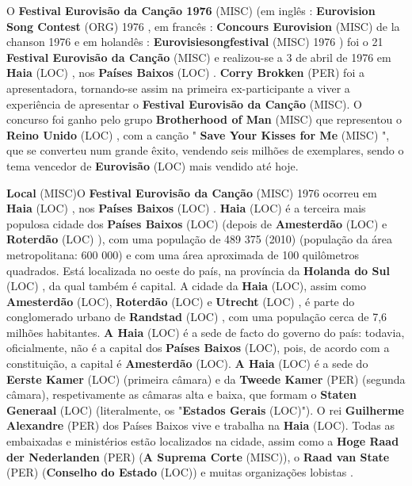 \documentclass[12pt,a4paper]{article}
\begin{document}
O \textbf{Festival Eurovisão da Canção 1976} (MISC) (em inglês : \textbf{Eurovision Song Contest} (ORG) 1976 , em francês : \textbf{Concours Eurovision} (MISC) de la chanson 1976 e em holandês : \textbf{Eurovisiesongfestival} (MISC) 1976 ) foi o 21 \textbf{Festival Eurovisão da Canção} (MISC) e realizou-se a 3 de abril de 1976 em \textbf{Haia} (LOC) , nos \textbf{Países Baixos} (LOC) . \textbf{Corry Brokken} (PER) foi a apresentadora, tornando-se assim na primeira ex-participante a viver a experiência de apresentar o \textbf{Festival Eurovisão da Canção} (MISC). O concurso foi ganho pelo grupo \textbf{Brotherhood of Man} (MISC) que representou o \textbf{Reino Unido} (LOC) , com a canção " \textbf{Save Your Kisses for Me} (MISC) ", que se converteu num grande êxito, vendendo seis milhões de exemplares, sendo o tema vencedor de \textbf{Eurovisão} (LOC) mais vendido até hoje.



\textbf{Local} (MISC)O \textbf{Festival Eurovisão da Canção} (MISC) 1976 ocorreu em \textbf{Haia} (LOC) , nos \textbf{Países Baixos} (LOC) . \textbf{Haia} (LOC) é a terceira mais populosa cidade dos \textbf{Países Baixos} (LOC) (depois de \textbf{Amesterdão} (LOC) e \textbf{Roterdão} (LOC) ), com uma população de 489 375 (2010) (população da área metropolitana: 600 000) e com uma área aproximada de 100 quilômetros quadrados. Está localizada no oeste do país, na província da \textbf{Holanda do Sul} (LOC) , da qual também é capital. A cidade da \textbf{Haia} (LOC), assim como \textbf{Amesterdão} (LOC), \textbf{Roterdão} (LOC) e \textbf{Utrecht} (LOC) , é parte do conglomerado urbano de \textbf{Randstad} (LOC) , com uma população cerca de 7,6 milhões habitantes. \textbf{A Haia} (LOC) é a sede de facto do governo do país: todavia, oficialmente, não é a capital dos \textbf{Países Baixos} (LOC), pois, de acordo com a constituição, a capital é \textbf{Amesterdão} (LOC). \textbf{A Haia} (LOC) é a sede do \textbf{Eerste Kamer} (LOC) (primeira câmara) e da \textbf{Tweede Kamer} (PER) (segunda câmara), respetivamente as câmaras alta e baixa, que formam o \textbf{Staten Generaal} (LOC) (literalmente, os "\textbf{Estados Gerais} (LOC)"). O rei \textbf{Guilherme Alexandre} (PER) dos Países Baixos vive e trabalha na \textbf{Haia} (LOC). Todas as embaixadas e ministérios estão localizados na cidade, assim como a \textbf{Hoge Raad der Nederlanden} (PER) (\textbf{A Suprema Corte} (MISC)), o \textbf{Raad van State} (PER) (\textbf{Conselho do Estado} (LOC)) e muitas organizações lobistas .
\end{document}
